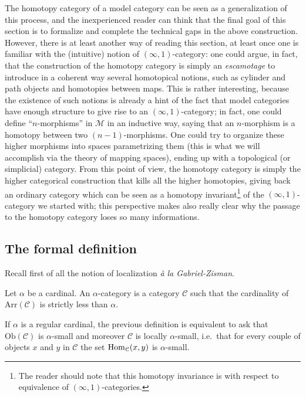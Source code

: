 \begin{refsection}
The homotopy category of a model category can be seen as a generalization of this process, and the inexperienced reader can think that the final goal of this section is to formalize and complete the technical gaps in the above construction. However, there is at least another way of reading this section, at least once one is familiar with the (intuitive) notion of $(\infty,1)$-category: one could argue, in fact, that the construction of the homotopy category is simply an \emph{escamotage} to introduce in a coherent way several homotopical notions, such as cylinder and path objects and homotopies between maps. This is rather interesting, because the existence of such notions is already a hint of the fact that model categories have enough structure to give rise to an $(\infty,1)$-category; in fact, one could define ``$n$-morphisms'' in $\mathcal M$ in an inductive way, saying that an $n$-morphism is a homotopy between two $(n-1)$-morphisms. One could try to organize these higher morphisms into spaces parametrizing them (this is what we will accomplish via the theory of mapping spaces), ending up with a topological (or simplicial) category. From this point of view, the homotopy category is simply the higher categorical construction that kills all the higher homotopies, giving back an ordinary category which can be seen as a homotopy invariant\footnote{The reader should note that this homotopy invariance is with respect to equivalence of $(\infty,1)$-categories.} of the $(\infty,1)$-category we started with; this perspective makes also really clear why the passage to the homotopy category loses so many informations.

\subsection{The formal definition}

Recall first of all the notion of localization \emph{\`a la Gabriel-Zisman}.

\begin{defin}
Let $\alpha$ be a cardinal. An $\alpha$-category is a category $\mathcal C$ such that the cardinality of $\mathrm{Arr}(\mathcal C)$ is strictly less than $\alpha$.
\end{defin}

\begin{rmk}
If $\alpha$ is a regular cardinal, the previous definition is equivalent to ask that $\mathrm{Ob}(\mathcal C)$ is $\alpha$-small and moreover $\mathcal C$ is locally $\alpha$-small, i.e.\ that for every couple of objects $x$ and $y$ in $\mathcal C$ the set $\mathrm{Hom}_{\mathcal C}(x,y)$ is $\alpha$-small.
\end{rmk}


\end{refsection}
